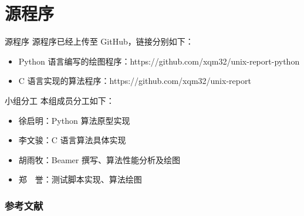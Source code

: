 \documentclass[aspectratio=169]{beamer}
\begin{document}
\section{源程序}

\begin{frame}[fragile]{源程序}
    源程序已经上传至 GitHub，链接分别如下：

    \begin{itemize}
        \item Python 语言编写的绘图程序：https://github.com/xqm32/unix-report-python
        \item C 语言实现的算法程序：https://github.com/xqm32/unix-report
    \end{itemize}
\end{frame}

\begin{frame}[fragile]{小组分工}
    本组成员分工如下：

    \begin{itemize}
        \item 徐启明：Python 算法原型实现
        \item 李文骏：C 语言算法具体实现
        \item 胡雨牧：Beamer 撰写、算法性能分析及绘图
        \item 郑　誉：测试脚本实现、算法绘图
    \end{itemize}
\end{frame}

\begin{frame}[allowframebreaks]
    \frametitle{参考文献}
    {
        \tiny
        \nocite{*}
        \printbibliography[heading=none]
    }
\end{frame}
\end{document}
